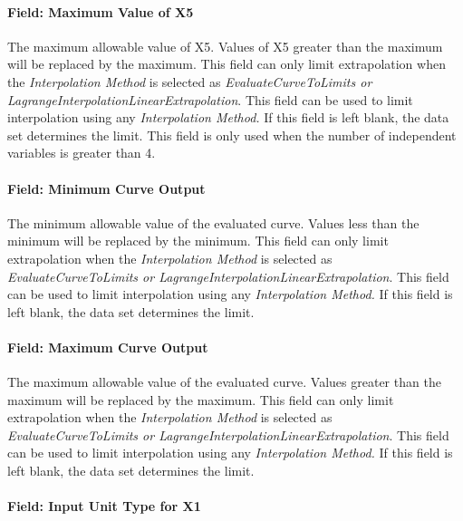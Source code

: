 \paragraph{Field: Maximum Value of X5}\label{field-maximum-value-of-x5}

The maximum allowable value of X5. Values of X5 greater than the maximum will be replaced by the maximum. This field can only limit extrapolation when the \emph{Interpolation Method} is selected as \emph{EvaluateCurveToLimits or LagrangeInterpolationLinearExtrapolation}. This field can be used to limit interpolation using any \emph{Interpolation Method.} If this field is left blank, the data set determines the limit. This field is only used when the number of independent variables is greater than 4.

\paragraph{Field: Minimum Curve Output}\label{field-minimum-curve-output-000}

The minimum allowable value of the evaluated curve. Values less than the minimum will be replaced by the minimum. This field can only limit extrapolation when the \emph{Interpolation Method} is selected as \emph{EvaluateCurveToLimits or LagrangeInterpolationLinearExtrapolation}. This field can be used to limit interpolation using any \emph{Interpolation Method.} If this field is left blank, the data set determines the limit.

\paragraph{Field: Maximum Curve Output}\label{field-maximum-curve-output-000}

The maximum allowable value of the evaluated curve. Values greater than the maximum will be replaced by the maximum. This field can only limit extrapolation when the \emph{Interpolation Method} is selected as \emph{EvaluateCurveToLimits or LagrangeInterpolationLinearExtrapolation}. This field can be used to limit interpolation using any \emph{Interpolation Method.} If this field is left blank, the data set determines the limit.

\paragraph{Field: Input Unit Type for X1}\label{field-input-unit-type-for-x1-1}

